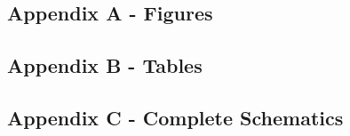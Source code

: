 
\subsection{Appendix A - Figures}

\subsection{Appendix B - Tables}

\subsection{Appendix C - Complete Schematics}

